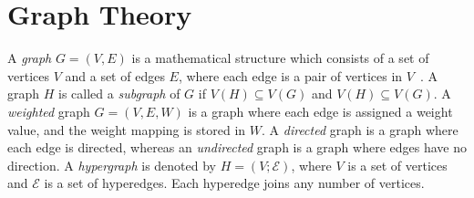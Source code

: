 \documentclass[12pt,a4paper]{report}
\begin{document}
\section{Graph Theory} \label{sec:graph_theory}
A \textit{graph} $G=(V,E)$ is a mathematical structure which consists of a set of vertices $V$ and a set of edges $E$, where each edge is a pair of vertices in $V$~\cite{chartrand}. A graph $H$ is called a \textit{subgraph} of $G$ if $V(H) \subseteq V(G)$ and $V(H) \subseteq V(G)$. A \textit{weighted} graph $G=(V,E,W)$ is a graph where each edge is assigned a weight value, and the weight mapping is stored in $W$. A \textit{directed} graph is a graph where each edge is directed, whereas an \textit{undirected} graph is a graph where edges have no direction. A \textit{hypergraph} is denoted by $H=(V;\mathcal{E})$, where $V$ is a set of vertices and $\mathcal{E}$ is a set of hyperedges. Each hyperedge joins any number of vertices.
\end{document}
